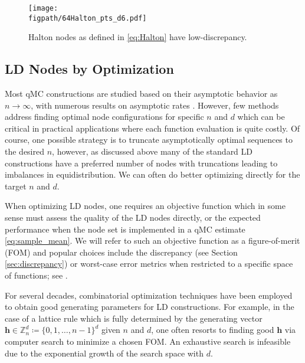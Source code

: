 \documentclass{svproc}
\newcommand{\figpath}{Figures}
\begin{document}
\begin{figure}
	\centering
	\texttt{[image: \\figpath/64Halton\_pts\_d6.pdf]}
	\caption{Halton nodes as defined in \eqref{eq:Halton} have low-discrepancy. 
    \label{fig:Halton}}
\end{figure}

\subsection{LD Nodes by Optimization}\label{sec:optLD}

Most qMC constructions are studied based on their asymptotic behavior as \(n \to \infty\), with numerous results on asymptotic rates \cite{Nie92,NovWoz10a}. However, few methods address finding optimal node configurations for specific \(n\) and \(d\) which can be critical in practical applications where each function evaluation is quite costly. Of course, one possible strategy is to truncate asymptotically optimal sequences to the desired \(n\), however, as discussed above many of the standard LD constructions have a preferred number of nodes with truncations leading to imbalances in equidistribution. We can often do better optimizing directly for the target \(n\) and \(d\).

When optimizing LD nodes, one requires an objective function which in some sense must assess the quality of the LD nodes directly, or the expected performance when the node set is implemented in a qMC estimate \eqref{eq:sample_mean}.  We will refer to such an objective function as a figure-of-merit (FOM) and popular choices include the discrepancy (see Section \ref{sec:discrepancy}) or worst-case error metrics when restricted to a specific space of functions; see \cite{Hic00a,LatNet}.


For several decades, combinatorial optimization techniques have been employed to obtain good generating parameters for LD constructions. For example, in the case of a lattice rule which is fully determined by the generating vector \(\boldsymbol{h} \in \mathbb{Z}_n^d \coloneqq \{0, 1, \ldots, n-1\}^d\) given $n$ and $d$,
one often resorts to finding good $\boldsymbol{h}$ via computer search to minimize a chosen FOM. An exhaustive search is infeasible due to the exponential growth of the search space with \(d\). 
\end{document}
